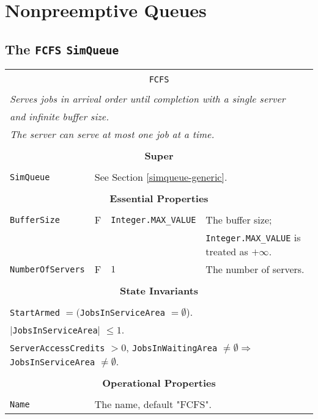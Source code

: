 \documentclass[12pt]{book}
\begin{document}
\section{Nonpreemptive Queues}

\subsection{The \lstinline{FCFS} \lstinline{SimQueue}}

\begin{tabular}{|l|l|l|l|}
\hline
\multicolumn{4}{|c|}{} \\
\multicolumn{4}{|c|}{\lstinline[basicstyle=\large]{FCFS}} \\
\multicolumn{4}{|c|}{} \\
\hline
\multicolumn{4}{|l|}{\em Serves jobs in arrival order until completion with a single server} \\
\multicolumn{4}{|l|}{\em and infinite buffer size.} \\
\multicolumn{4}{|l|}{\em The server can serve at most one job at a time.} \\
\hline
\multicolumn{4}{|c|}{} \\
\multicolumn{4}{|c|}{\bf Super} \\
\multicolumn{4}{|c|}{} \\
\hline
\lstinline|SimQueue| & \multicolumn{3}{|l|}{See Section \ref{simqueue-generic}.} \\
\hline
\multicolumn{4}{|c|}{} \\
\multicolumn{4}{|c|}{\bf Essential Properties} \\
\multicolumn{4}{|c|}{} \\
\hline
\lstinline|BufferSize|      & F & \lstinline|Integer.MAX_VALUE|
                            & The buffer size; \\
                        & & & \lstinline|Integer.MAX_VALUE| is treated as $+\infty$. \\
\hline
\lstinline|NumberOfServers| & F & $1$
                            & The number of servers. \\
\hline
\multicolumn{4}{|c|}{} \\
\multicolumn{4}{|c|}{\bf State  Invariants} \\
\multicolumn{4}{|c|}{} \\
\hline
\multicolumn{4}{|l|}{\lstinline|StartArmed| $= ($\lstinline|JobsInServiceArea| $= \emptyset$).} \\
\multicolumn{4}{|l|}{$|$\lstinline|JobsInServiceArea|$|$ $\leq 1$.} \\
\multicolumn{4}{|l|}{\lstinline|ServerAccessCredits| $> 0$, \lstinline|JobsInWaitingArea| $\neq \emptyset
                     \Rightarrow$ \lstinline|JobsInServiceArea| $\neq \emptyset$.} \\
\hline
\multicolumn{4}{|c|}{} \\
\multicolumn{4}{|c|}{\bf Operational Properties} \\
\multicolumn{4}{|c|}{} \\
\hline
\lstinline|Name| & \multicolumn{3}{|l|}{The name, default "FCFS".} \\
\hline
\end{tabular}
\end{document}
